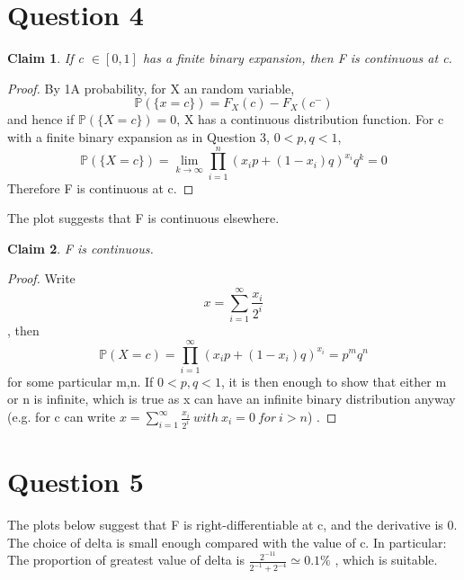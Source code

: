 \documentclass[11pt]{article}
\newtheorem{claim}{Claim}
\begin{document}
\section*{Question 4}
\begin{claim}
If c $\in \left[0,1\right] $ has a finite binary expansion, then F is continuous at c.
\end{claim}
\begin{proof}
By 1A probability, for X an random variable,
\begin{equation*}
\mathbb{P}(\lbrace x=c\rbrace)=F_{X}(c)-F_{X}(c^{-})
\end{equation*}
and hence if $\mathbb{P}(\lbrace X=c \rbrace)=0$, X has a continuous distribution function.
For c with a finite binary expansion as in Question 3, $0<p,q<1$, 
\begin{equation*}
\mathbb{P}(\lbrace X=c \rbrace)=\lim_{k \to \infty}\prod_{i=1}^{n}(x_{i}p+(1-x_{i})q)^{x_{i}}q^{k}=0  
\end{equation*}
Therefore F is continuous at c.
\end{proof}
The plot suggests that F is continuous elsewhere.
\begin{claim}
F is continuous.
\end{claim}
\begin{proof}
Write $$x=\sum_{i=1}^{\infty}\frac{x_{i}}{2^{i}}$$, then
$$\mathbb{P}({X=c})=\prod_{i=1}^{\infty}(x_{i}p+(1-x_{i})q)^{x_{i}}=p^{m}q^{n}$$for some particular m,n.
If $0<p, q<1$, it is then enough to show that either m or n is infinite, which is true as x can have an infinite binary distribution anyway (e.g. for c can write $x=\sum_{i=1}^{\infty}\frac{x_{i}}{2^{i}}\ with\ x_{i} = 0\ for\  i > n$) . 
\end{proof}
\section*{Question 5}
The plots below suggest that F is right-differentiable at c, and the derivative is 0. The choice of delta is small enough compared with the value of c. In particular: The proportion of greatest value of delta is $\frac{2^{-11}}{2^{-1}+2^{-4}}\simeq0.1\% $ , which is suitable.
\end{document}
